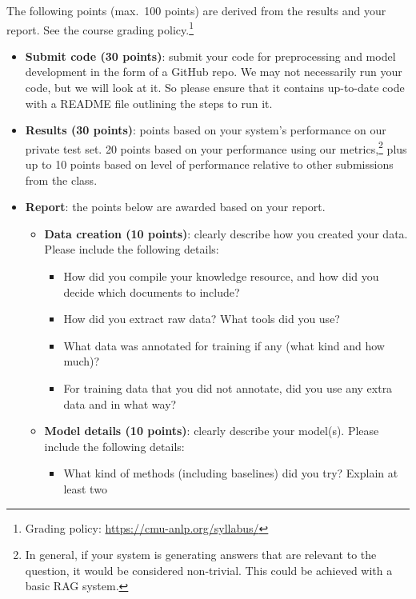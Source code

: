 \documentclass[11pt]{article}
\newcommand{\subsec}[1]{%
  \vspace{0.8em}
  \noindent{\sffamily\bfseries\color{mauve} #1}
  \vspace{0.35em}
  \par
}
\begin{document}
\subsec{Grading}

\noindent The following points (max.\ 100 points) are derived from the results and your report. See
the course grading policy.\footnote{Grading policy: \url{https://cmu-anlp.org/syllabus/}}

\begin{itemize}[leftmargin=2em]
  \item \textbf{Submit code (30 points)}: submit your code for preprocessing and model development in
    the form of a GitHub repo. We may not necessarily run your code, but we will look at it. So please
    ensure that it contains up-to-date code with a README file outlining the steps to run it.
  \item \textbf{Results (30 points)}: points based on your system's performance on our private test
    set. 20 points based on your performance using our metrics,\footnote{In general, if your system is
    generating answers that are relevant to the question, it would be considered non-trivial. This
    could be achieved with a basic RAG system.} plus up to 10 points based on level of performance
    relative to other submissions from the class.
  \item \textbf{Report}: the points below are awarded based on your report.
    \begin{itemize}[leftmargin=1.6em]
      \item \textbf{Data creation (10 points)}: clearly describe how you created your data. Please
        include the following details:
        \begin{itemize}[nosep, leftmargin=1.4em]
          \item How did you compile your knowledge resource, and how did you decide which documents to
            include?
          \item How did you extract raw data? What tools did you use?
          \item What data was annotated for training if any (what kind and how much)?
          \item For training data that you did not annotate, did you use any extra data and in what
            way?
        \end{itemize}
      \item \textbf{Model details (10 points)}: clearly describe your model(s). Please include the
        following details:
        \begin{itemize}[nosep, leftmargin=1.4em]
          \item What kind of methods (including baselines) did you try? Explain at least two

\end{itemize}
\end{itemize}
\end{itemize}
\end{document}
